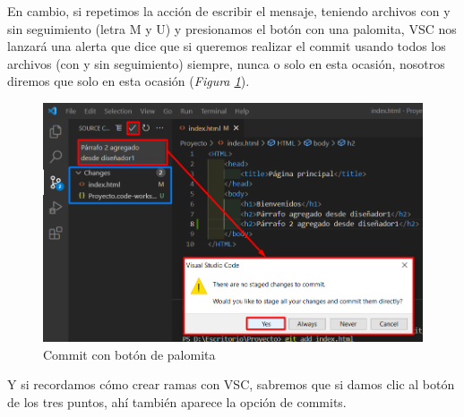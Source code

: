 En cambio, si repetimos la acción de escribir el mensaje, teniendo archivos con y sin seguimiento (letra M y U) y presionamos el botón con una palomita, VSC nos lanzará una alerta que dice que si queremos realizar el commit usando todos los archivos (con y sin seguimiento) siempre, nunca o solo en esta ocasión, nosotros diremos que solo en esta ocasión (\textit{Figura \ref{fig: 22}}).
\begin{figure}[H]
    \centering
    \caption{Commit con botón de palomita}
    \label{fig: 22}
    \includegraphics[width=13cm]{capturas/commits2.png}
\end{figure}

Y si recordamos cómo crear ramas con VSC, sabremos que si damos clic al botón de los tres puntos, ahí también aparece la opción de commits.


